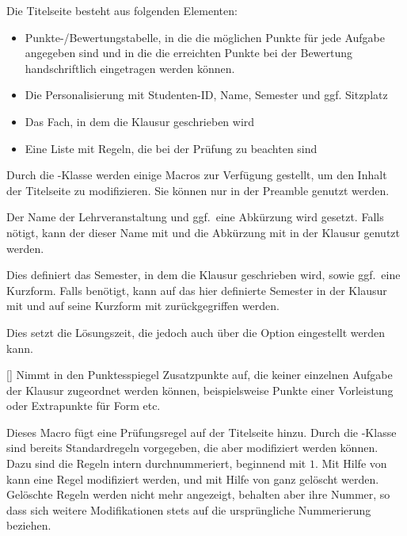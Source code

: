 \documentclass[
load=osgexam,
babel=ngerman
]{skdoc}
\begin{document}
Die Titelseite besteht aus folgenden Elementen:
\begin{itemize}[nosep]
  \item Punkte-/Bewertungstabelle, in die die möglichen Punkte für jede Aufgabe angegeben sind und in die die erreichten Punkte bei
    der Bewertung handschriftlich eingetragen werden können.
  \item Die Personalisierung mit Studenten-ID, Name, Semester und ggf. Sitzplatz
  \item Das Fach, in dem die Klausur geschrieben wird
  \item Eine Liste mit Regeln, die bei der Prüfung zu beachten sind
\end{itemize}
Durch die \thepkg-Klasse werden einige Macros zur Verfügung gestellt, um den Inhalt der Titelseite zu modifizieren.
Sie können nur in der Preamble genutzt werden.

\DescribeMacro{} Der Name der Lehrveranstaltung und ggf.\ eine Abkürzung wird
gesetzt. Falls nötigt, kann der dieser Name mit  und die Abkürzung mit  in
der Klausur genutzt werden.

\DescribeMacro{} Dies definiert das Semester, in dem die Klausur geschrieben wird,
sowie ggf.\ eine Kurzform. Falls benötigt, kann auf das hier definierte Semester in der Klausur mit
 und auf seine Kurzform mit  zurückgegriffen werden.
\medskip

\DescribeMacro{} Dies setzt die Lösungszeit, die jedoch auch über die Option 
eingestellt werden kann.

[]{} Nimmt in den Punktesspiegel Zusatzpunkte auf, die
keiner einzelnen Aufgabe der Klausur zugeordnet werden können, beispielsweise Punkte einer Vorleistung oder Extrapunkte
für Form etc.

Dieses Macro fügt eine Prüfungsregel auf der Titelseite hinzu. Durch die \thepkg-Klasse sind bereits Standardregeln
vorgegeben, die aber modifiziert werden können. Dazu sind die Regeln intern durchnummeriert, beginnend mit $1$. Mit
Hilfe von  kann eine Regel modifiziert werden,
und mit Hilfe von  ganz gelöscht werden. Gelöschte Regeln werden
nicht mehr angezeigt, behalten aber ihre Nummer, so dass sich weitere Modifikationen stets auf die ursprüngliche
Nummerierung beziehen.
\end{document}
